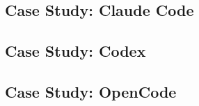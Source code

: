 \subsection{Case Study: Claude Code} %
\subsection{Case Study: Codex}
\subsection{Case Study: OpenCode}



